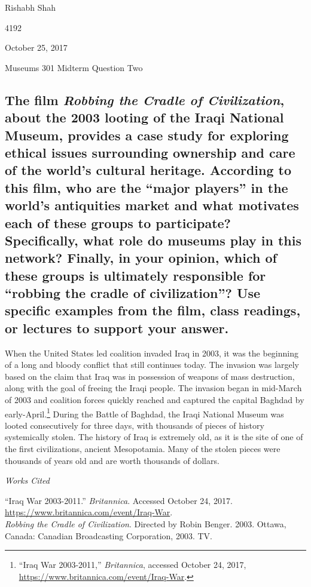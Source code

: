 \documentclass[11pt]{article}
\newenvironment{bib}[1]
  {\begin{list}
          {}
          {\setlength{\itemindent}{-#1}
           \setlength{\leftmargin}{#1}
           \setlength{\itemsep}{0pt}
           \setlength{\parsep}{\parskip}
           \setlength{\topsep}{\parskip}
           }
    \setlength{\parindent}{-#1}
    \item[]
  }
  {\end{list}}
\begin{document}
\singlespacing
{\Large\noindent Rishabh Shah

 4192

\noindent October 25, 2017

\noindent Museums 301 Midterm Question Two}

\subsection*{The film \textit{Robbing the Cradle of Civilization}, about the 2003 looting of the Iraqi National Museum, provides a case study for exploring ethical issues surrounding ownership and care of the world’s cultural heritage. According to this film, who are the ``major players'' in the world’s antiquities market and what motivates each of these groups to participate? Specifically, what role do museums play in this network? Finally, in your opinion, which of these groups is ultimately responsible for ``robbing the cradle of civilization''? Use specific examples from the film, class readings, or lectures to support your answer.}

\doublespacing
When the United States led coalition invaded Iraq in 2003, it was the beginning of a long and bloody conflict that still continues today. The invasion was largely based on the claim that Iraq was in possession of weapons of mass destruction, along with the goal of freeing the Iraqi people. The invasion began in mid-March of 2003 and coalition forces quickly reached and captured the capital Baghdad by early-April.\footnote{``Iraq War 2003-2011,'' \textit{Britannica}, accessed October 24, 2017, \url{https://www.britannica.com/event/Iraq-War}.} During the Battle of Baghdad, the Iraqi National Museum was looted consecutively for three days, with thousands of pieces of history systemically stolen. The history of Iraq is extremely old, as it is the site of one of the first civilizations, ancient Mesopotamia. Many of the stolen pieces were thousands of years old and are worth thousands of dollars. 

\newpage
\singlespacing
\begin{center}
{\large\textit{Works Cited}}
\end{center}

\begin{bib}{2em}
``Iraq War 2003-2011.'' \textit{Britannica}. Accessed October 24, 2017. \url{https://www.britannica.com/event/Iraq-War}. \\

\textit{Robbing the Cradle of Civilization}. Directed by Robin Benger. 2003. Ottawa, Canada: Canadian Broadcasting Corporation, 2003. TV.
\end{bib}
\end{document}
